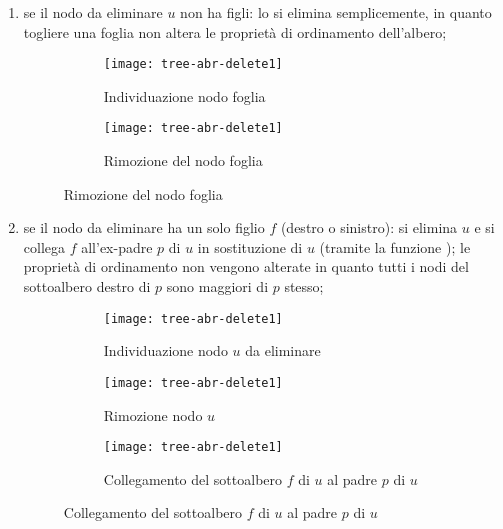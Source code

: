 \clearpage
\begin{enumerate}[label={\footnotesize\ttfamily (\arabic*)}]
	\item se il nodo da eliminare \(u\) non ha figli: lo si elimina semplicemente, in quanto togliere una foglia non altera le proprietà di ordinamento dell'albero;
	\vspace{-5pt}
	\begin{figure}[H]\centering
		\hfill
		\begin{subfigure}[t]{.3\linewidth}
			\texttt{[image: tree-abr-delete1]}
			\caption{Individuazione nodo foglia}
		\end{subfigure}
		\hfill
		\begin{subfigure}[t]{.3\linewidth}
			\texttt{[image: tree-abr-delete1]}
			\caption{Rimozione del nodo foglia}
		\end{subfigure}
		\hfill\null
	\end{figure}
	\vspace{-15pt}
	\item se il nodo da eliminare ha un solo figlio \(f\) (destro o sinistro): si elimina \(u\) e si collega \(f\) all'ex-padre \(p\) di \(u\) in sostituzione di \(u\) (tramite la funzione \shortcut);
	le proprietà di ordinamento non vengono alterate in quanto tutti i nodi del sottoalbero destro di \(p\) sono maggiori di \(p\) stesso;
	\vspace{-5pt}
	\begin{figure}[H]
		\begin{subfigure}[t]{.3\linewidth}
			\texttt{[image: tree-abr-delete1]}
			\caption{Individuazione nodo \(u\) da eliminare}
		\end{subfigure}
		\hfill
		\begin{subfigure}[t]{.3\linewidth}
			\texttt{[image: tree-abr-delete1]}
			\caption{Rimozione nodo \(u\)}
		\end{subfigure}
		\hfill
		\begin{subfigure}[t]{.3\linewidth}
			\texttt{[image: tree-abr-delete1]}
			\caption{Collegamento del sottoalbero \(f\) di \(u\) al padre \(p\) di \(u\)}
		\end{subfigure}
	\end{figure}

\end{enumerate}
